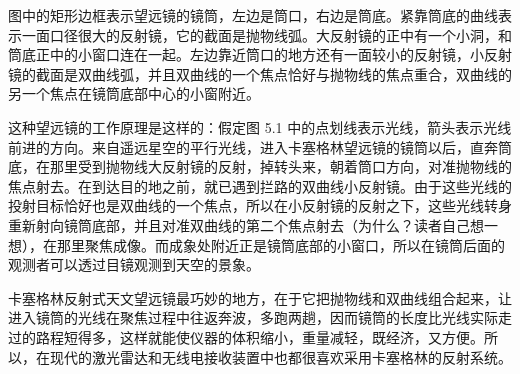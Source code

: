 图中的矩形边框表示望远镜的镜筒，左边是筒口，右边是筒底。紧靠筒底的曲线表示一面口径很大的反射镜，它的截面是抛物线弧。大反射镜的正中有一个小洞，和筒底正中的小窗口连在一起。左边靠近筒口的地方还有一面较小的反射镜，小反射镜的截面是双曲线弧，并且双曲线的一个焦点恰好与抛物线的焦点重合，双曲线的另一个焦点在镜筒底部中心的小窗附近。

这种望远镜的工作原理是这样的：假定图 5.1 中的点划线表示光线，箭头表示光线前进的方向。来自遥远星空的平行光线，进入卡塞格林望远镜的镜筒以后，直奔筒底，在那里受到抛物线大反射镜的反射，掉转头来，朝着筒口方向，对准抛物线的焦点射去。在到达目的地之前，就已遇到拦路的双曲线小反射镜。由于这些光线的投射目标恰好也是双曲线的一个焦点，所以在小反射镜的反射之下，这些光线转身重新射向镜筒底部，并且对准双曲线的第二个焦点射去（为什么？读者自己想一想），在那里聚焦成像。而成象处附近正是镜筒底部的小窗口，所以在镜筒后面的观测者可以透过目镜观测到天空的景象。

卡塞格林反射式天文望远镜最巧妙的地方，在于它把抛物线和双曲线组合起来，让进入镜筒的光线在聚焦过程中往返奔波，多跑两趟，因而镜筒的长度比光线实际走过的路程短得多，这样就能使仪器的体积缩小，重量减轻，既经济，又方便。所以，在现代的激光雷达和无线电接收装置中也都很喜欢采用卡塞格林的反射系统。
